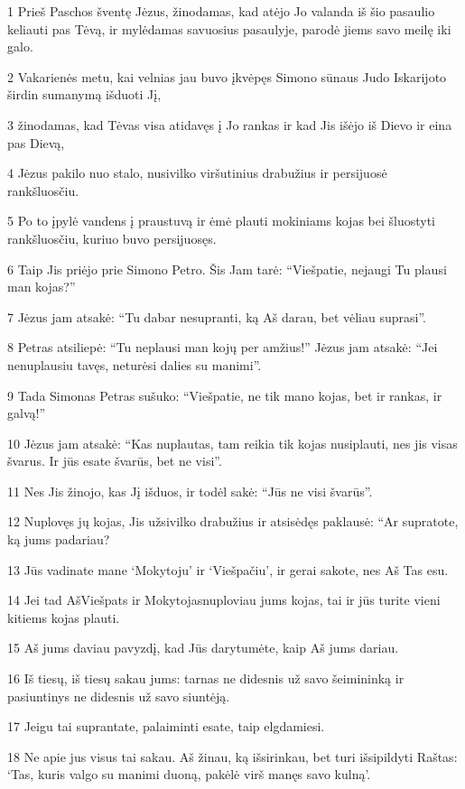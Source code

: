 \par 1 Prieš Paschos šventę Jėzus, žinodamas, kad atėjo Jo valanda iš šio pasaulio keliauti pas Tėvą, ir mylėdamas savuosius pasaulyje, parodė jiems savo meilę iki galo. 
\par 2 Vakarienės metu, kai velnias jau buvo įkvėpęs Simono sūnaus Judo Iskarijoto širdin sumanymą išduoti Jį, 
\par 3 žinodamas, kad Tėvas visa atidavęs į Jo rankas ir kad Jis išėjo iš Dievo ir eina pas Dievą, 
\par 4 Jėzus pakilo nuo stalo, nusivilko viršutinius drabužius ir persijuosė rankšluosčiu. 
\par 5 Po to įpylė vandens į praustuvą ir ėmė plauti mokiniams kojas bei šluostyti rankšluosčiu, kuriuo buvo persijuosęs. 
\par 6 Taip Jis priėjo prie Simono Petro. Šis Jam tarė: “Viešpatie, nejaugi Tu plausi man kojas?” 
\par 7 Jėzus jam atsakė: “Tu dabar nesupranti, ką Aš darau, bet vėliau suprasi”. 
\par 8 Petras atsiliepė: “Tu neplausi man kojų per amžius!” Jėzus jam atsakė: “Jei nenuplausiu tavęs, neturėsi dalies su manimi”. 
\par 9 Tada Simonas Petras sušuko: “Viešpatie, ne tik mano kojas, bet ir rankas, ir galvą!” 
\par 10 Jėzus jam atsakė: “Kas nuplautas, tam reikia tik kojas nusiplauti, nes jis visas švarus. Ir jūs esate švarūs, bet ne visi”. 
\par 11 Nes Jis žinojo, kas Jį išduos, ir todėl sakė: “Jūs ne visi švarūs”. 
\par 12 Nuplovęs jų kojas, Jis užsivilko drabužius ir atsisėdęs paklausė: “Ar supratote, ką jums padariau? 
\par 13 Jūs vadinate mane ‘Mokytoju’ ir ‘Viešpačiu’, ir gerai sakote, nes Aš Tas esu. 
\par 14 Jei tad Aš­Viešpats ir Mokytojas­nuploviau jums kojas, tai ir jūs turite vieni kitiems kojas plauti. 
\par 15 Aš jums daviau pavyzdį, kad Jūs darytumėte, kaip Aš jums dariau. 
\par 16 Iš tiesų, iš tiesų sakau jums: tarnas ne didesnis už savo šeimininką ir pasiuntinys ne didesnis už savo siuntėją. 
\par 17 Jeigu tai suprantate, palaiminti esate, taip elgdamiesi. 
\par 18 Ne apie jus visus tai sakau. Aš žinau, ką išsirinkau, bet turi išsipildyti Raštas: ‘Tas, kuris valgo su manimi duoną, pakėlė virš manęs savo kulną’. 
